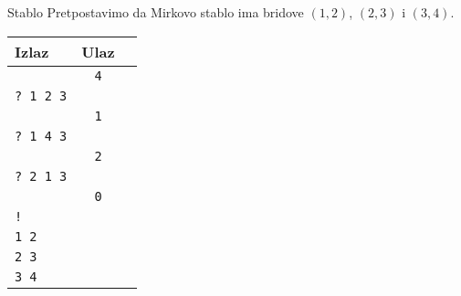 \begin{statement}[
  problempoints=100,
  timelimit=1 sekunda,
  memorylimit=512 MiB,
]{Stablo}
Pretpostavimo da Mirkovo stablo ima bridove $(1, 2)$, $(2, 3)$ i $(3, 4)$.

{\renewcommand{\arraystretch}{1.4}
  \setlength{\tabcolsep}{6pt}
  \begin{tabular}{lcl}
    Izlaz & Ulaz\\ \midrule
    \texttt{} & \texttt{4} \\
    \texttt{\frenchspacing? 1 2 3} & \texttt{}  \\
    \texttt{ } & \texttt{1} \\
    \texttt{\frenchspacing? 1 4 3} & \texttt{} \\
    \texttt{ } & \texttt{2} \\
    \texttt{\frenchspacing? 2 1 3} & \texttt{} \\
    \texttt{ } & \texttt{0} \\    
    \texttt{\frenchspacing!} &\\
    \texttt{1 2} & \texttt{} \\
    \texttt{2 3} & \texttt{} \\
    \texttt{3 4} & \texttt{} \\
\end{tabular}}


\end{statement}

